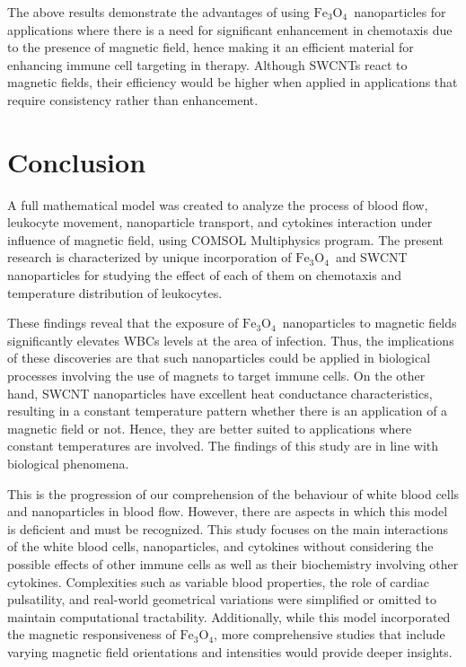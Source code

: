 \documentclass[10pt]{NSP1}
\def\feo{\ensuremath{\mathrm{Fe}_3\mathrm{O}_4}}
\begin{document}
	The above results demonstrate the advantages of using \feo\ nanoparticles for applications where there is a need for significant enhancement in chemotaxis due to the presence of magnetic field, hence making it an efficient material for enhancing immune cell targeting in therapy. Although SWCNTs react to magnetic fields, their efficiency would be higher when applied in applications that require consistency rather than enhancement.
	
	\section{Conclusion}
	
	A full mathematical model was created to analyze the process of blood flow, leukocyte movement, nanoparticle transport, and cytokines interaction under influence of magnetic field, using COMSOL Multiphysics program. The present research is characterized by unique incorporation of \feo\ and SWCNT nanoparticles for studying the effect of each of them on chemotaxis and temperature distribution of leukocytes.
	
	These findings reveal that the exposure of \feo\ nanoparticles to magnetic fields significantly elevates WBCs levels at the area of infection. Thus, the implications of these discoveries are that such nanoparticles could be applied in biological processes involving the use of magnets to target immune cells. On the other hand, SWCNT nanoparticles have excellent heat conductance characteristics, resulting in a constant temperature pattern whether there is an application of a magnetic field or not. Hence, they are better suited to applications where constant temperatures are involved. The findings of this study are in line with biological phenomena.
	
	This is the progression of our comprehension of the behaviour of white blood cells and nanoparticles in blood flow. However, there are aspects in which this model is deficient and must be recognized. This study focuses on the main interactions of the white blood cells, nanoparticles, and cytokines without considering the possible effects of other immune cells as well as their biochemistry involving other cytokines. Complexities such as variable blood properties, the role of cardiac pulsatility, and real-world geometrical variations were simplified or omitted to maintain computational tractability. Additionally, while this model incorporated the magnetic responsiveness of \feo, more comprehensive studies that include varying magnetic field orientations and intensities would provide deeper insights.
	
\end{document}
